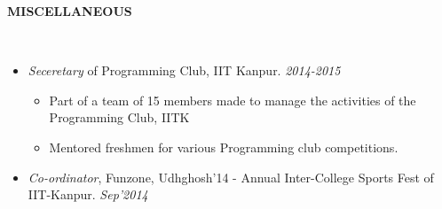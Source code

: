 \documentclass[a4paper,9pt]{extarticle}
\newcommand{\lsep}{-0.5cm}
\newcommand{\resheading}[1]{{\small \colorbox{mygrey}{\begin{minipage}{0.975\textwidth}{\textbf{#1 \vphantom{p\^{E}}}}\end{minipage}}}}
\begin{document}
        \vspace{-1mm}
        \resheading{\textbf{MISCELLANEOUS} }\\[\lsep] \vspace{1mm}
        \begin{itemize} \itemsep -2pt
        \item \textit{Seceretary} of Programming Club, IIT Kanpur. \hfill \textit{2014-2015}
          \vspace{-2mm}\begin{itemize}
          \item Part of a team of 15 members made to manage the activities of the Programming Club, IITK
          \item Mentored freshmen for various Programming club competitions.
          \end{itemize}
        \item \textit{Co-ordinator},
          Funzone, Udhghosh'14 - Annual Inter-College Sports Fest of IIT-Kanpur. \hfill \textit{Sep'2014}
        \end{itemize}\vspace{-\baselineskip}
      
\end{document}
